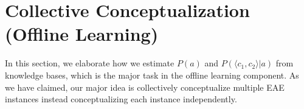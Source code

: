 \renewcommand{\arraystretch}{1}

%
%
%
%
%
%
%
%
%
%
%
%
%

\section{Collective Conceptualization (Offline Learning)}
In this section, we elaborate how we estimate $P(a)$ and $P( \langle c_{1},c_{2} \rangle |a)$ from knowledge bases, which is the major task in the offline learning component. As we have claimed, our major idea is collectively conceptualize multiple EAE instances instead conceptualizing each instance independently.


